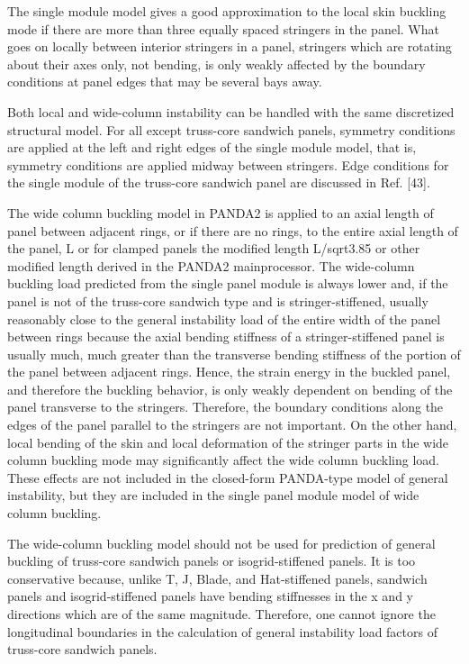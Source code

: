 The single module model gives a good approximation to the local skin
buckling mode if there are more than three equally spaced stringers in the
panel.  What goes on locally between interior stringers in a panel,
stringers which are rotating about their axes only, not bending, is only
weakly affected by the boundary conditions at panel edges that may be
several bays away. 

Both local and wide-column instability can be handled with the same
discretized structural model. For all except truss-core sandwich panels,
symmetry conditions are applied at the left and right edges of the single
module model, that is, symmetry conditions are applied midway between
stringers.  Edge conditions for the single module of the truss-core
sandwich panel are discussed in Ref. [43]. 

The wide column buckling model in PANDA2 is applied to an axial length of
panel between adjacent rings, or if there are no rings, to the entire
axial length of the panel, L or for clamped panels the modified length
L/sqrt{3.85} or other modified length derived in the PANDA2 mainprocessor.
The wide-column buckling load predicted from the single panel module is
always lower and, if the panel is not of the truss-core sandwich type and
is stringer-stiffened, usually reasonably close to the general instability
load of the entire width of the panel between rings because the axial
bending stiffness of a stringer-stiffened panel is usually much, much
greater than the transverse bending stiffness of the portion of the panel
between adjacent rings. Hence, the strain energy in the buckled panel, and
therefore the buckling behavior, is only weakly dependent on bending of
the panel transverse to the stringers. Therefore, the boundary conditions
along the edges of the panel parallel to the stringers are not important. 
On the other hand, local bending of the skin and local deformation of the
stringer parts in the wide column buckling mode may significantly affect
the wide column buckling load.  These effects are not included in the
closed-form PANDA-type model of general instability, but they are included
in the single panel module model of wide column buckling. 

The wide-column buckling model should not be used for prediction of
general buckling of truss-core sandwich panels or isogrid-stiffened
panels. It is too conservative because, unlike T, J, Blade, and
Hat-stiffened panels, sandwich panels and isogrid-stiffened panels have
bending stiffnesses in the x and y directions which are of the same
magnitude.  Therefore, one cannot ignore the longitudinal boundaries in
the calculation of general instability load factors of truss-core sandwich
panels.

